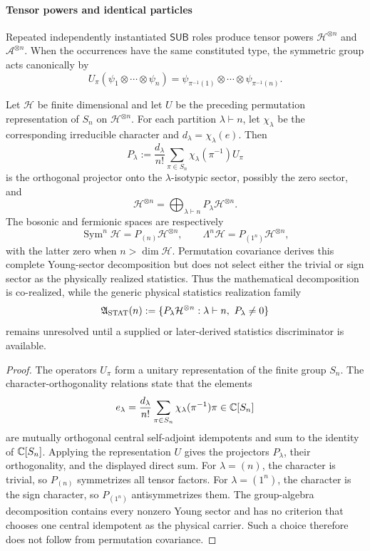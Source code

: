 \documentclass[12pt,a4paper]{article}
\begin{document}
\paragraph{Tensor powers and identical particles}
\label{p4:sec:part2-identical}

Repeated independently instantiated \(\mathsf{SUB}\) roles produce tensor powers
\(\mathcal H^{\otimes n}\) and \(\mathcal A^{\otimes n}\).  When the occurrences
have the same constituted type, the symmetric group acts canonically by
\[
U_\pi(\psi_1\otimes\cdots\otimes\psi_n)
=
\psi_{\pi^{-1}(1)}\otimes\cdots\otimes\psi_{\pi^{-1}(n)} .
\]

\begin{theorem}
\label{p4:thm:permutation-sector-decomposition}
Let \(\mathcal H\) be finite dimensional and let \(U\) be the preceding
permutation representation of \(S_n\) on \(\mathcal H^{\otimes n}\).  For each
partition \(\lambda\vdash n\), let \(\chi_\lambda\) be the corresponding
irreducible character and \(d_\lambda=\chi_\lambda(e)\).  Then
\[
P_\lambda
:=
\frac{d_\lambda}{n!}
\sum_{\pi\in S_n}\chi_\lambda(\pi^{-1})U_\pi
\]
is the orthogonal projector onto the \(\lambda\)-isotypic sector, possibly the
zero sector, and
\[
\mathcal H^{\otimes n}
=
\bigoplus_{\lambda\vdash n}P_\lambda\mathcal H^{\otimes n}.
\]
The bosonic and fermionic spaces are respectively
\[
\operatorname{Sym}^n\mathcal H=P_{(n)}\mathcal H^{\otimes n},
\qquad
\Lambda^n\mathcal H=P_{(1^n)}\mathcal H^{\otimes n},
\]
with the latter zero when \(n>\dim\mathcal H\).  Permutation covariance derives
this complete Young-sector decomposition but does not select either the
trivial or sign sector as the physically realized statistics.  Thus the
mathematical decomposition is co-realized, while the generic physical
statistics realization family
\[
 \mathfrak A_{\rm STAT}(n)
 :=\{P_\lambda\mathcal H^{\otimes n}:\lambda\vdash n,\ P_\lambda\ne0\}
\]
remains unresolved until a supplied or later-derived statistics discriminator
is available.
\end{theorem}

\begin{proof}
The operators \(U_\pi\) form a unitary representation of the finite group
\(S_n\).  The character-orthogonality relations state that the elements
\[
e_\lambda
=
\frac{d_\lambda}{n!}
\sum_{\pi\in S_n}\chi_\lambda(\pi^{-1})\pi
\in\mathbb{C}[S_n]
\]
are mutually orthogonal central self-adjoint idempotents and sum to the
identity of \(\mathbb{C}[S_n]\).  Applying the representation \(U\) gives the
projectors \(P_\lambda\), their orthogonality, and the displayed direct sum.
For \(\lambda=(n)\), the character is trivial, so \(P_{(n)}\) symmetrizes all
tensor factors.  For \(\lambda=(1^n)\), the character is the sign character,
so \(P_{(1^n)}\) antisymmetrizes them.  The group-algebra decomposition
contains every nonzero Young sector and has no criterion that chooses one
central idempotent as the physical carrier.  Such a choice therefore does not
follow from permutation covariance.
\end{proof}
\end{document}
